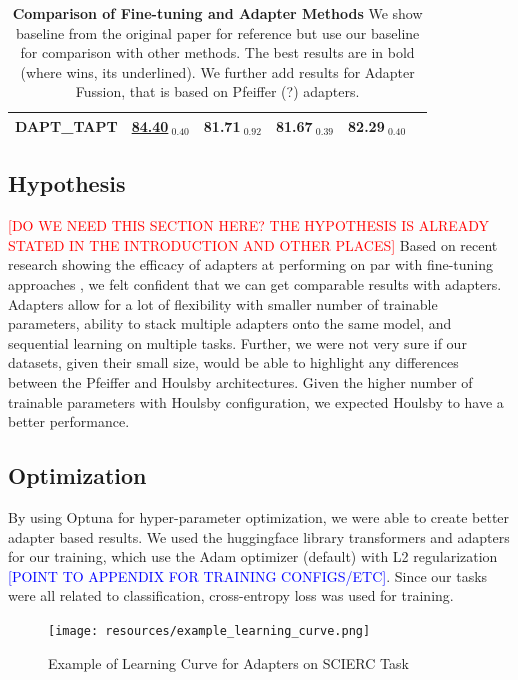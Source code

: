 \documentclass[draft,10pt,twocolumn,letterpaper]{article}
\begin{document}
\begin{table}[h]
\begin{tabular}{@{}lcc|cc|c@{}}
    DAPT\_TAPT & \underline{84.40}$_{\text{ 0.40}}$ & 81.71$_{\text{ 0.92}}$ & 81.67$_{\text{ 0.39}}$ & \textbf{82.29}$_{\text{ 0.40}}$ &  \\
    \bottomrule
    \end{tabular}
    \caption{\textbf{Comparison of Fine-tuning and Adapter Methods} We show baseline from the original paper \cite{gururangan2020dont} for reference but use our baseline for comparison with other methods. The best results are in bold (where \cite{gururangan2020dont} wins, its underlined). We further add results for Adapter Fussion, that is based on Pfeiffer (?) adapters.}
\end{table}

\subsection{Hypothesis} 
\textcolor{red}{[DO WE NEED THIS SECTION HERE? THE HYPOTHESIS IS ALREADY STATED IN THE INTRODUCTION AND OTHER PLACES]}
Based on recent research showing the efficacy of adapters at performing on par with fine-tuning approaches \cite{houlsby2019parameter}, we felt confident that we can get comparable results with adapters. Adapters allow for a lot of flexibility with smaller number of trainable parameters, ability to stack multiple adapters onto the same model, and sequential learning on multiple tasks. Further, we were not very sure if our datasets, given their small size, would be able to highlight any differences between the Pfeiffer and Houlsby architectures. Given the higher number of trainable parameters with Houlsby configuration, we expected Houlsby to have a better performance.

\subsection{Optimization} By using Optuna for hyper-parameter optimization, we were able to create better adapter based results. We used the huggingface library transformers and adapters for our training, which use the Adam optimizer (default) with L2 regularization \textcolor{blue}{[POINT TO APPENDIX FOR TRAINING CONFIGS/ETC]}. Since our tasks were all related to classification, cross-entropy loss was used for training. 


\begin{figure}[h]
    \centering 
    \texttt{[image: resources/example\_learning\_curve.png]}
    \caption{Example of Learning Curve for Adapters on SCIERC Task}
    \label{fig:learning_curve}
\end{figure}
\end{document}
